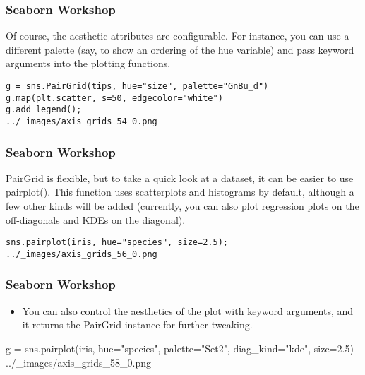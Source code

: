 \begin{frame}[fragile]
	\frametitle{Seaborn Workshop}
	\large
Of course, the aesthetic attributes are configurable. For instance, you can use a different palette (say, to show an ordering of the hue variable) and pass keyword arguments into the plotting functions.
\begin{verbatim}
g = sns.PairGrid(tips, hue="size", palette="GnBu_d")
g.map(plt.scatter, s=50, edgecolor="white")
g.add_legend();
../_images/axis_grids_54_0.png
\end{verbatim}
\end{frame}
\begin{frame}[fragile]
\frametitle{Seaborn Workshop}
\large

PairGrid is flexible, but to take a quick look at a dataset, it can be easier to use pairplot(). This function uses scatterplots and histograms by default, although a few other kinds will be added (currently, you can also plot regression plots on the off-diagonals and KDEs on the diagonal).
\begin{verbatim}
sns.pairplot(iris, hue="species", size=2.5);
../_images/axis_grids_56_0.png
\end{verbatim}

\end{frame}
\begin{frame}[fragile]
	\frametitle{Seaborn Workshop}
	\large
	\begin{itemize}
\item You can also control the aesthetics of the plot with keyword arguments, and it returns the PairGrid instance for further tweaking.

	\end{itemize}

g = sns.pairplot(iris, hue="species", palette="Set2", diag_kind="kde", size=2.5)
../_images/axis_grids_58_0.png
\end{frame}
